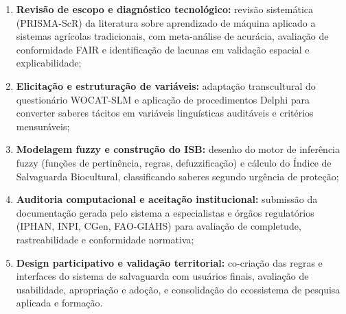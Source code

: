 \begin{enumerate}[label=\bfseries(\Roman*)]
  \item \textbf{Revisão de escopo e diagnóstico tecnológico:} revisão sistemática (PRISMA-ScR) da literatura sobre aprendizado de máquina aplicado a sistemas agrícolas tradicionais, com meta-análise de acurácia, avaliação de conformidade FAIR e identificação de lacunas em validação espacial e explicabilidade;

  \item \textbf{Elicitação e estruturação de variáveis:} adaptação transcultural do questionário WOCAT-SLM e aplicação de procedimentos Delphi para converter saberes tácitos em variáveis linguísticas auditáveis e critérios mensuráveis;

  \item \textbf{Modelagem fuzzy e construção do ISB:} desenho do motor de inferência fuzzy (funções de pertinência, regras, defuzzificação) e cálculo do Índice de Salvaguarda Biocultural, classificando saberes segundo urgência de proteção;

  \item \textbf{Auditoria computacional e aceitação institucional:} submissão da documentação gerada pelo sistema a especialistas e órgãos regulatórios (IPHAN, INPI, CGen, FAO-GIAHS) para avaliação de completude, rastreabilidade e conformidade normativa;

  \item \textbf{Design participativo e validação territorial:} co-criação das regras e interfaces do sistema de salvaguarda com usuários finais, avaliação de usabilidade, apropriação e adoção, e consolidação do ecossistema de pesquisa aplicada e formação.
\end{enumerate}



